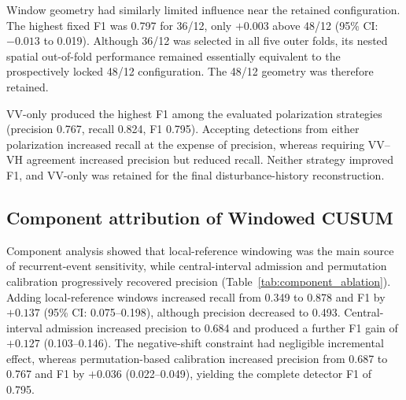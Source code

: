 Window geometry had similarly limited influence near the retained configuration. The highest fixed F1 was 0.797 for 36/12, only $+0.003$ above 48/12 (95\% CI: $-0.013$ to 0.019). Although 36/12 was selected in all five outer folds, its nested spatial out-of-fold performance remained essentially equivalent to the prospectively locked 48/12 configuration. The 48/12 geometry was therefore retained.

VV-only produced the highest F1 among the evaluated polarization strategies (precision 0.767, recall 0.824, F1 0.795). Accepting detections from either polarization increased recall at the expense of precision, whereas requiring VV--VH agreement increased precision but reduced recall. Neither strategy improved F1, and VV-only was retained for the final disturbance-history reconstruction.


\subsection{Component attribution of Windowed CUSUM}
\label{sec:representation_component_ablation}

Component analysis showed that local-reference windowing was the main source of recurrent-event sensitivity, while central-interval admission and permutation calibration progressively recovered precision (Table~\ref{tab:component_ablation}). Adding local-reference windows increased recall from 0.349 to 0.878 and F1 by $+0.137$ (95\% CI: 0.075--0.198), although precision decreased to 0.493. Central-interval admission increased precision to 0.684 and produced a further F1 gain of $+0.127$ (0.103--0.146). The negative-shift constraint had negligible incremental effect, whereas permutation-based calibration increased precision from 0.687 to 0.767 and F1 by $+0.036$ (0.022--0.049), yielding the complete detector F1 of 0.795.

